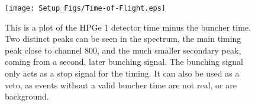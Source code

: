 \begin{figure}[hbt!]
    \centering
    \texttt{[image: Setup\_Figs/Time-of-Flight.eps]}
    \caption{This is a plot of the HPGe 1 detector time minus the buncher time. Two distinct peaks can be seen in the spectrum, the main timing peak close to channel 800, and the much smaller secondary peak, coming from a second, later bunching signal. The bunching signal only acts as a stop signal for the timing. It can also be used as a veto, as events without a valid buncher time are not real, or are background.}
    \label{fig:bunched}
\end{figure}